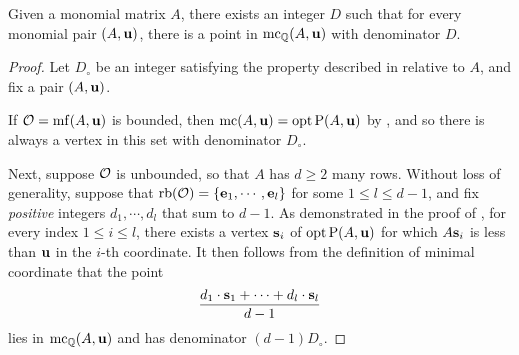 \documentclass[11pt]{amsart}
\begin{document}


\begin{theorem}  
\label{uniform denominators for mc:  T}
Given a monomial matrix $A$, there exists an integer $D$ such that for every monomial pair $(A, \mathbf{u})$, there is a point in $\operatorname{mc}_{\mathbb{Q}}(A, \mathbf{u})$ with denominator $D$.
\end{theorem}


\begin{proof}  Let $D_{\circ}$ be an integer satisfying the property described in  relative to $A$, and fix a pair $(A, \mathbf{u})$.  

If $\mathcal{O} = \operatorname{mf}(A, \mathbf{u})$ is bounded, then $\operatorname{mc}(A, \mathbf{u}) = \operatorname{opt} \mathrm{P}(A, \mathbf{u})$ by , and so there is always a vertex in this set with denominator $D_{\circ}$.  

Next,  suppose $\mathcal{O}$ is unbounded, so that $A$ has $d \geq 2$ many rows.  Without loss of generality, suppose that $\operatorname{rb}(\mathcal{O}) = \{ \mathbf{e}_1, \cdots, \mathbf{e}_l \}$ for some $1 \leq l \leq d-1$, and fix \emph{positive} integers $d_1, \cdots, d_l$ that sum to $d-1$.  As demonstrated in the  proof of , for every index  $1 \leq i \leq l$, there exists a vertex $\mathbf{s}_i$ of $\operatorname{opt} \mathrm{P}(A, \mathbf{u})$ for which $A \mathbf{s}_i$ is less than $\mathbf{u}$ in the $i$-th coordinate.  It then follows from the definition of minimal coordinate that the point \[  \frac{ d_1 \cdot \mathbf{s}_1 + \cdots + d_l \cdot  \mathbf{s}_l}{d-1}  \]
lies in $\operatorname{mc}_{\mathbb{Q}}(A, \mathbf{u})$ and has denominator $(d-1)D_{\circ}$.  
\end{proof}
\end{document}
